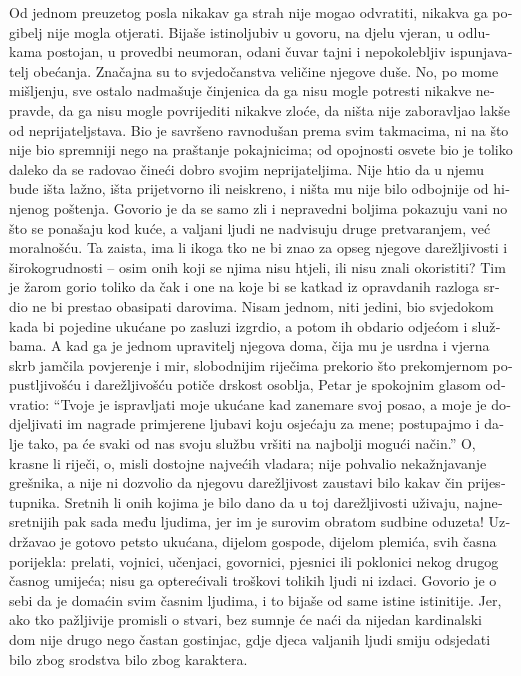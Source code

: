 \documentclass[a5paper,twoside]{article}
\begin{document}
\begin{pages}
\begin{Rightside}
\begin{croatian}
  
\pend
\pstart
Od jednom preuzetog posla nikakav ga strah nije mogao odvratiti, nikakva ga pogibelj nije mogla otjerati.  Bijaše istinoljubiv u govoru, na djelu vjeran, u odlukama postojan, u provedbi neumoran, odani čuvar tajni i nepokolebljiv ispunjavatelj obećanja. Značajna su to svjedočanstva veličine njegove duše.  No, po mome mišljenju, sve ostalo nadmašuje činjenica da ga nisu mogle potresti nikakve nepravde, da ga nisu mogle povrijediti nikakve zloće, da ništa nije zaboravljao lakše od neprijateljstava.  Bio je savršeno ravnodušan prema svim takmacima, ni na što nije bio spremniji nego na praštanje pokajnicima; od opojnosti osvete bio je toliko daleko da se radovao čineći dobro svojim neprijateljima.  
\pend
\pstart
Nije htio da u njemu bude išta lažno, išta prijetvorno ili neiskreno, i ništa mu nije bilo odbojnije od hinjenog poštenja.  Govorio je da se samo zli i nepravedni boljima pokazuju vani no što se ponašaju kod kuće, a valjani ljudi ne nadvisuju druge pretvaranjem, već moralnošću.  Ta zaista, ima li ikoga tko ne bi znao za opseg njegove darežljivosti i širokogrudnosti – osim onih koji se njima nisu htjeli, ili nisu znali okoristiti?  Tim je žarom gorio toliko da čak i one na koje bi se katkad iz opravdanih razloga srdio ne bi prestao obasipati darovima.  Nisam jednom, niti jedini, bio svjedokom kada bi pojedine ukućane po zasluzi izgrdio, a potom ih obdario odjećom i službama. A kad ga je jednom upravitelj njegova doma, čija mu je usrdna i vjerna skrb jamčila povjerenje i mir, %
slobodnijim riječima prekorio što prekomjernom popustljivošću i darežljivošću potiče drskost osoblja, Petar je spokojnim glasom odvratio: ``Tvoje je ispravljati moje ukućane kad zanemare svoj posao, a moje je dodjeljivati im nagrade primjerene ljubavi koju osjećaju za mene; postupajmo i dalje tako, pa će svaki od nas svoju službu vršiti na najbolji mogući način.''  O, krasne li riječi, o, misli dostojne najvećih vladara; nije pohvalio nekažnjavanje grešnika, a nije ni dozvolio da njegovu darežljivost zaustavi bilo kakav čin prijestupnika.  Sretnih li onih kojima je bilo dano da u toj darežljivosti uživaju, najnesretnijih pak sada među ljudima, jer im je surovim obratom sudbine oduzeta!  
\pend
\pstart
Uzdržavao je gotovo petsto ukućana, dijelom gospode, dijelom plemića, svih časna porijekla: prelati, vojnici, učenjaci, govornici, pjesnici ili poklonici nekog drugog časnog umijeća; nisu ga opterećivali troškovi tolikih ljudi ni izdaci. Govorio je o sebi da je domaćin svim časnim ljudima, i to bijaše od same istine istinitije.  Jer, ako tko pažljivije promisli o stvari, bez sumnje će naći da nijedan kardinalski dom nije drugo nego častan gostinjac, gdje djeca valjanih ljudi smiju odsjedati bilo zbog srodstva bilo zbog karaktera.


\end{croatian}
\end{Rightside}
\end{pages}
\end{document}
